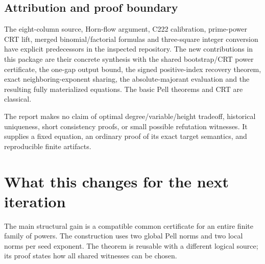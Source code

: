 \documentclass[11pt]{article}
\theoremstyle{definition}
\theoremstyle{remark}
\begin{document}
\subsection{Attribution and proof boundary}
The eight-column source, Horn-flow argument, C222 calibration, prime-power
CRT lift, merged binomial/factorial formulas and three-square integer
conversion have explicit predecessors in the inspected repository.
The new contributions in this package are their concrete synthesis with
the shared bootstrap/CRT power certificate, the one-gap output bound,
the signed positive-index recovery theorem, exact neighboring-exponent
sharing, the absolute-majorant evaluation and the resulting fully
materialized equations. The basic Pell theorems and CRT are classical.

The report makes no claim of optimal degree/variable/height tradeoff,
historical uniqueness, short consistency proofs, or small possible
refutation witnesses. It supplies a fixed equation, an ordinary proof
of its exact target semantics, and reproducible finite artifacts.

\section{What this changes for the next iteration}

The main structural gain is a compatible common certificate for an entire
finite family of powers. The construction uses two global Pell norms and
two local norms per seed exponent. The theorem is reusable with a different
logical source; its proof states how all shared witnesses can be chosen.
\end{document}
